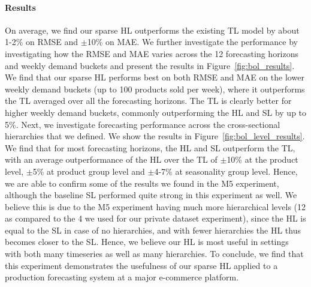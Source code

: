 \documentclass[preprint, 3p, times, twocolumn]{elsarticle}
\begin{document}
  \paragraph{Results} On average, we find our sparse HL outperforms the existing TL model by about 1-2\% on RMSE and \(\pm\)10\% on MAE. We further investigate the performance by investigating how the RMSE and MAE varies across the 12 forecasting horizons and weekly demand buckets and present the results in Figure~\ref{fig:bol_results}. We find that our sparse HL performs best on both RMSE and MAE on the lower weekly demand buckets (up to 100 products sold per week), where it outperforms the TL averaged over all the forecasting horizons. The TL is clearly better for higher weekly demand  buckets, commonly outperforming the HL and SL by up to 5\%. Next, we investigate forecasting performance across the cross-sectional hierarchies that we defined. We show the results in Figure~\ref{fig:bol_level_results}. We find that for most forecasting horizons, the HL and SL outperform the TL, with an average outperformance of the HL over the TL of \(\pm\)10\% at the  product level, \(\pm\)5\% at product group level and \(\pm\)4-7\% at seasonality group level. Hence, we are able to confirm some of the results we found in the M5 experiment, although the baseline SL performed quite strong in this experiment as well. We believe this is due to the M5 experiment having much more hierarchical levels (12 as compared to the 4 we used for our private dataset experiment), since the HL is equal to the SL in case of no hierarchies, and with fewer hierarchies the HL thus becomes closer to the SL. Hence, we believe our HL is most useful in settings with both many timeseries as well as many hierarchies.
  To conclude, we find that this experiment demonstrates the usefulness of our sparse HL applied to a production forecasting system at a major e-commerce platform.
\end{document}
